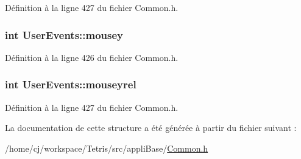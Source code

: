 Définition à la ligne 427 du fichier Common.\-h.

\hypertarget{struct_user_events_a5e19f7d7787b60f3376bfe63f841f1f7}{
\subsubsection[{mousey}]{\setlength{\rightskip}{0pt plus 5cm}int User\-Events\-::mousey}}\label{struct_user_events_a5e19f7d7787b60f3376bfe63f841f1f7}


Définition à la ligne 426 du fichier Common.\-h.

\hypertarget{struct_user_events_afea18ec7d92eb4348d1f122fbac368aa}{
\subsubsection[{mouseyrel}]{\setlength{\rightskip}{0pt plus 5cm}int User\-Events\-::mouseyrel}}\label{struct_user_events_afea18ec7d92eb4348d1f122fbac368aa}


Définition à la ligne 427 du fichier Common.\-h.



La documentation de cette structure a été générée à partir du fichier suivant \-:\begin{DoxyCompactItemize}
\item 
/home/cj/workspace/\-Tetris/src/appli\-Base/\hyperlink{_common_8h}{Common.\-h}\end{DoxyCompactItemize}
